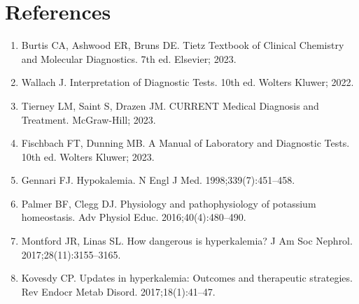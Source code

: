\section*{References}
\begin{enumerate}
  \item Burtis CA, Ashwood ER, Bruns DE. Tietz Textbook of Clinical Chemistry and Molecular Diagnostics. 7th ed. Elsevier; 2023.
  \item Wallach J. Interpretation of Diagnostic Tests. 10th ed. Wolters Kluwer; 2022.
  \item Tierney LM, Saint S, Drazen JM. CURRENT Medical Diagnosis and Treatment. McGraw-Hill; 2023.
  \item Fischbach FT, Dunning MB. A Manual of Laboratory and Diagnostic Tests. 10th ed. Wolters Kluwer; 2023.
  \item Gennari FJ. Hypokalemia. N Engl J Med. 1998;339(7):451--458.
  \item Palmer BF, Clegg DJ. Physiology and pathophysiology of potassium homeostasis. Adv Physiol Educ. 2016;40(4):480--490.
  \item Montford JR, Linas SL. How dangerous is hyperkalemia? J Am Soc Nephrol. 2017;28(11):3155--3165.
  \item Kovesdy CP. Updates in hyperkalemia: Outcomes and therapeutic strategies. Rev Endocr Metab Disord. 2017;18(1):41--47.
\end{enumerate}

\clearpage
